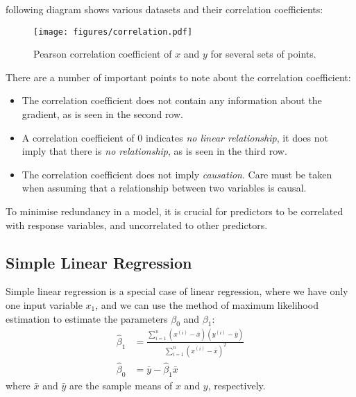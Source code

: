 \documentclass{article}
\begin{document}
following diagram shows various datasets and their correlation
coefficients:
\begin{figure}[H]
    \centering
    \texttt{[image: figures/correlation.pdf]}
    \caption{Pearson correlation coefficient of \(x\) and \(y\) for several sets of points.} %
\end{figure}
There are a number of important points to note about the correlation
coefficient:
\begin{itemize}
    \item The correlation coefficient does not contain any information
          about the gradient, as is seen in the second row.
    \item A correlation coefficient of 0 indicates \textit{no linear
          relationship}, it does not imply that there is \textit{no
          relationship}, as is seen in the third row.
    \item The correlation coefficient does not imply
          \textit{causation}. Care must be taken when assuming that a
          relationship between two variables is causal.
\end{itemize}
To minimise redundancy in a model, it is crucial for predictors to be
correlated with response variables, and uncorrelated to other predictors.
\subsection{Simple Linear Regression}
Simple linear regression is a special case of linear regression, where
we have only one input variable \(x_1\), and we can use the method of
maximum likelihood estimation to estimate the parameters \(\beta_0\)
and \(\beta_1\):
\begin{align*}
    \hat{\beta}_1 & = \frac{\sum_{i = 1}^n \left( x^{\left( i \right)} - \bar{x} \right) \left( y^{\left( i \right)} - \bar{y} \right)}{\sum_{i = 1}^n {\left( x^{\left( i \right)} - \bar{x} \right)}^2} \\
    \hat{\beta}_0 & = \bar{y} - \hat{\beta}_1 \bar{x}
\end{align*}
where \(\bar{x}\) and \(\bar{y}\) are the sample means of \(x\) and \(y\),
respectively.
\end{document}
